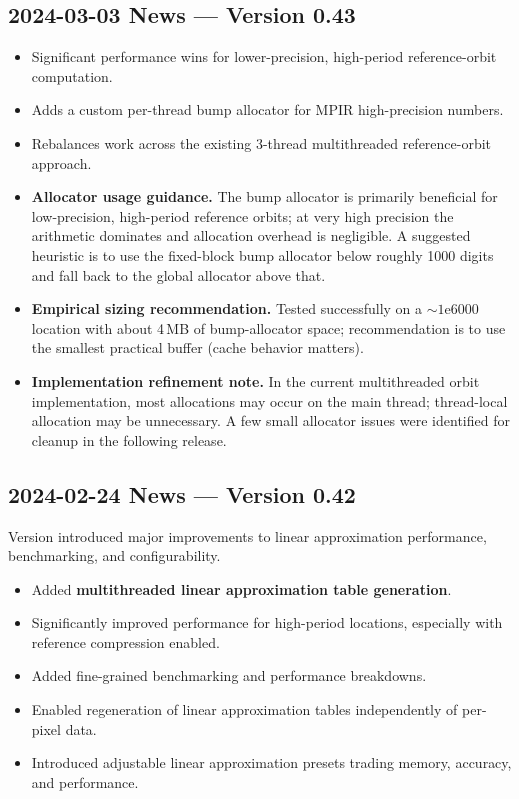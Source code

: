\subsection{2024-03-03 News --- Version 0.43}
\begin{itemize}
  
  \item Significant performance wins for lower-precision, high-period
  reference-orbit computation.
  
  \item Adds a custom per-thread bump allocator for MPIR high-precision numbers.
  
  \item Rebalances work across the existing 3-thread multithreaded
  reference-orbit approach.

  \item \textbf{Allocator usage guidance.} The bump allocator is primarily
  beneficial for low-precision, high-period reference orbits; at very high
  precision the arithmetic dominates and allocation overhead is negligible. A
  suggested heuristic is to use the fixed-block bump allocator below roughly
  1000 digits and fall back to the global allocator above that.

  \item \textbf{Empirical sizing recommendation.} Tested successfully on a $\sim
  1\mathrm{e}{6000}$ location with about 4\,MB of bump-allocator space;
  recommendation is to use the smallest practical buffer (cache behavior matters).

  \item \textbf{Implementation refinement note.} In the current multithreaded
  orbit implementation, most allocations may occur on the main thread;
  thread-local allocation may be unnecessary. A few small allocator issues were
  identified for cleanup in the following release.

\end{itemize}


\subsection{2024-02-24 News --- Version 0.42}

Version  introduced major improvements to linear approximation performance, benchmarking, and configurability.

\begin{itemize}
  \item Added \textbf{multithreaded linear approximation table generation}.
  \item Significantly improved performance for high-period locations, especially with reference compression enabled.
  \item Added fine-grained benchmarking and performance breakdowns.
  \item Enabled regeneration of linear approximation tables independently of per-pixel data.
  \item Introduced adjustable linear approximation presets trading memory, accuracy, and performance.
\end{itemize}

